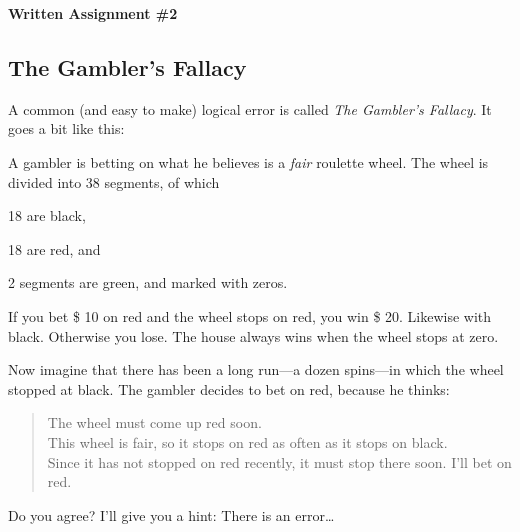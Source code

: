 \documentclass[12pt,letterpaper]{article}
\begin{document}
\setlength{\parskip}{1ex plus 0.5ex minus 0.2ex}
\setlength{\parindent}{0pt}

\pagestyle{fancy}
\lfoot{}
\rfoot{}

\begin{center}
{
\Large
\textbf{Written Assignment \#2}
}
\end{center}

\subsection*{The Gambler's Fallacy} A common (and easy to make) logical error is called \emph{The Gambler's Fallacy}. It goes a bit like this:

A gambler is betting on what he believes is a \emph{fair} roulette wheel. The wheel is divided into 38 segments, of which 
\begin{compactitem}
\item 18 are black,
\item 18 are red, and
\item 2 segments are green, and marked with zeros.
\end{compactitem}

If you bet \$ 10 on red and the wheel stops on red, you win \$ 20. Likewise with black. Otherwise you lose. The house always wins when the wheel stops at zero.

Now imagine that there has been a long run---a dozen spins---in which the wheel stopped at black. The gambler decides to bet on red, because he thinks:

\begin{quote} The wheel must come up red soon.\\
This wheel is fair, so it stops on red as often as it stops on black.\\
Since it has not stopped on red recently, it must stop there soon. I'll bet on red.
\end{quote}

Do you agree? I'll give you a hint: There is an error\dots 
\end{document}
